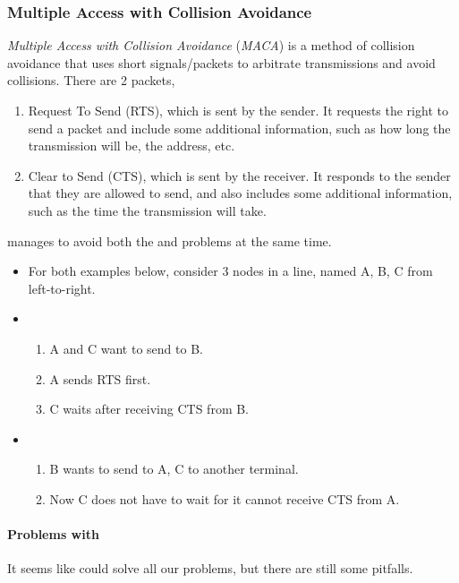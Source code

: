\subsubsection{Multiple Access with Collision Avoidance}\label{subsubsec:MACA}
\begin{definition}\label{def:MACA}
  \emph{Multiple Access with Collision Avoidance} (\emph{MACA}) is a method of collision avoidance that uses short signals/packets to arbitrate transmissions and avoid collisions.
  There are 2 packets,
  \begin{enumerate}[noitemsep]
  \item Request To Send (RTS), which is sent by the sender. It requests the right to send a packet and include some additional information, such as how long the transmission will be, the address, etc.
  \item Clear to Send (CTS), which is sent by the receiver. It responds to the sender that they are allowed to send, and also includes some additional information, such as the time the transmission will take.
  \end{enumerate}
\end{definition}

 manages to avoid both the  and  problems at the same time.
\begin{itemize}[noitemsep]
\item For both examples below, consider 3 nodes in a line, named A, B, C from left-to-right.
\item {}
  \begin{enumerate}[noitemsep]
  \item A and C want to send to B.
  \item A sends RTS first.
  \item C waits after receiving CTS from B.
  \end{enumerate}

\item {}
  \begin{enumerate}[noitemsep]
  \item B wants to send to A, C to another terminal.
  \item Now C does not have to wait for it cannot receive CTS from A.
  \end{enumerate}
\end{itemize}

\paragraph{Problems with }\label{par:MACA_Problems}
It seems like  could solve all our problems, but there are still some pitfalls.

